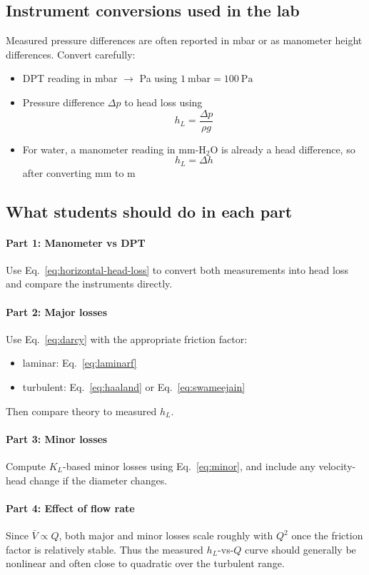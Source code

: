 \subsection{Instrument conversions used in the lab}
Measured pressure differences are often reported in mbar or as manometer height differences. Convert carefully:
\begin{itemize}[leftmargin=*]
    \item DPT reading in mbar \(\rightarrow\) Pa using \(1~\mathrm{mbar}=100~\mathrm{Pa}\)
    \item Pressure difference \(\Delta p\) to head loss using
    \[
    h_L = \frac{\Delta p}{\rho g}
    \]
    \item For water, a manometer reading in mm-H\(_2\)O is already a head difference, so
    \[
    h_L = \Delta h
    \]
    after converting mm to m
\end{itemize}

\subsection{What students should do in each part}
\paragraph{Part 1: Manometer vs DPT}
Use Eq.~\eqref{eq:horizontal-head-loss} to convert both measurements into head loss and compare the instruments directly.

\paragraph{Part 2: Major losses}
Use Eq.~\eqref{eq:darcy} with the appropriate friction factor:
\begin{itemize}[leftmargin=*]
    \item laminar: Eq.~\eqref{eq:laminarf}
    \item turbulent: Eq.~\eqref{eq:haaland} or Eq.~\eqref{eq:swameejain}
\end{itemize}
Then compare theory to measured \(h_L\).

\paragraph{Part 3: Minor losses}
Compute \(K_L\)-based minor losses using Eq.~\eqref{eq:minor}, and include any velocity-head change if the diameter changes.

\paragraph{Part 4: Effect of flow rate}
Since \(\bar{V}\propto Q\), both major and minor losses scale roughly with \(Q^2\) once the friction factor is relatively stable. Thus the measured \(h_L\)-vs-\(Q\) curve should generally be nonlinear and often close to quadratic over the turbulent range.